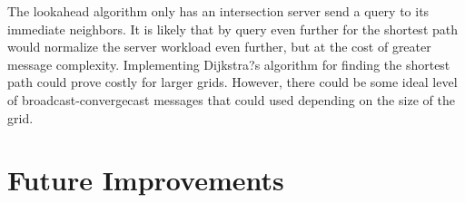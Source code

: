 \documentclass[conference]{IEEEtran}
\begin{document}
The lookahead algorithm only has an intersection server send a query to its immediate neighbors. It is likely that by query even further for the shortest path would normalize the server workload even further, but at the cost of greater message complexity. Implementing Dijkstra?s algorithm for finding the shortest path could prove costly for larger grids. However, there could be some ideal level of broadcast-convergecast messages that could used depending on the size of the grid.

\section{Future Improvements}

%
%
%
%
\end{document}
